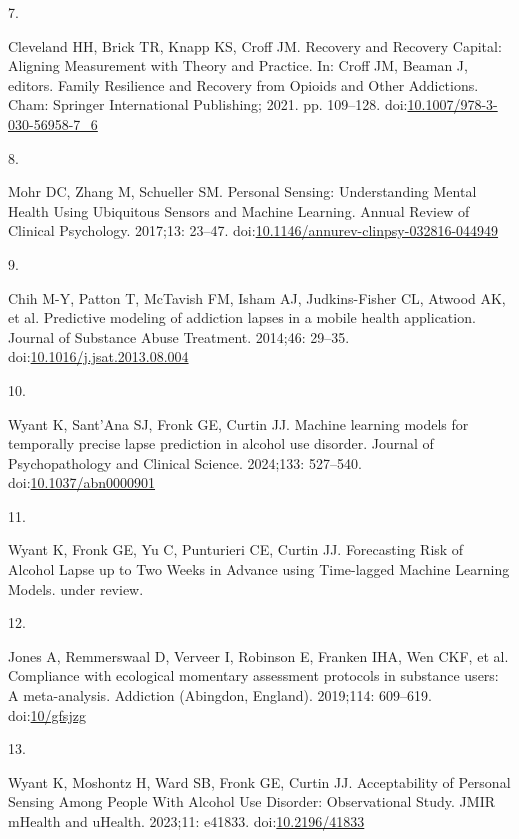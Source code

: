 \documentclass[
  letterpaper,
  DIV=11,
  numbers=noendperiod]{scrartcl}
\newlength{\cslhangindent}
\newlength{\csllabelwidth}
\newenvironment{CSLReferences}[2] %
 {\begin{list}{}{%
  \setlength{\itemindent}{0pt}
  \setlength{\leftmargin}{0pt}
  \setlength{\parsep}{0pt}
  \ifodd #1
   \setlength{\leftmargin}{\cslhangindent}
   \setlength{\itemindent}{-1\cslhangindent}
  \fi
  \setlength{\itemsep}{#2\baselineskip}}}
 {\end{list}}
\newcommand{\CSLLeftMargin}[1]{\parbox[t]{\csllabelwidth}{\strut#1\strut}}
\newcommand{\CSLRightInline}[1]{\parbox[t]{\linewidth - \csllabelwidth}{\strut#1\strut}}
\begin{document}
\begin{CSLReferences}{0}{1}
\CSLLeftMargin{7. }%
\CSLRightInline{Cleveland HH, Brick TR, Knapp KS, Croff JM. Recovery and
{Recovery Capital}: {Aligning Measurement} with {Theory} and {Practice}.
In: Croff JM, Beaman J, editors. Family {Resilience} and {Recovery} from
{Opioids} and {Other Addictions}. Cham: Springer International
Publishing; 2021. pp. 109--128.
doi:\href{https://doi.org/10.1007/978-3-030-56958-7_6}{10.1007/978-3-030-56958-7\_6}}

\CSLLeftMargin{8. }%
\CSLRightInline{Mohr DC, Zhang M, Schueller SM. Personal {Sensing}:
{Understanding Mental Health Using Ubiquitous Sensors} and {Machine
Learning}. Annual Review of Clinical Psychology. 2017;13: 23--47.
doi:\href{https://doi.org/10.1146/annurev-clinpsy-032816-044949}{10.1146/annurev-clinpsy-032816-044949}}

\CSLLeftMargin{9. }%
\CSLRightInline{Chih M-Y, Patton T, McTavish FM, Isham AJ,
Judkins-Fisher CL, Atwood AK, et al. Predictive modeling of addiction
lapses in a mobile health application. Journal of Substance Abuse
Treatment. 2014;46: 29--35.
doi:\href{https://doi.org/10.1016/j.jsat.2013.08.004}{10.1016/j.jsat.2013.08.004}}

\CSLLeftMargin{10. }%
\CSLRightInline{Wyant K, Sant'Ana SJ, Fronk GE, Curtin JJ. Machine
learning models for temporally precise lapse prediction in alcohol use
disorder. Journal of Psychopathology and Clinical Science. 2024;133:
527--540.
doi:\href{https://doi.org/10.1037/abn0000901}{10.1037/abn0000901}}

\CSLLeftMargin{11. }%
\CSLRightInline{Wyant K, Fronk GE, Yu C, Punturieri CE, Curtin JJ.
Forecasting {Risk} of {Alcohol Lapse} up to {Two Weeks} in {Advance}
using {Time-lagged Machine Learning Models}. under review. }

\CSLLeftMargin{12. }%
\CSLRightInline{Jones A, Remmerswaal D, Verveer I, Robinson E, Franken
IHA, Wen CKF, et al. Compliance with ecological momentary assessment
protocols in substance users: A meta-analysis. Addiction (Abingdon,
England). 2019;114: 609--619.
doi:\href{https://doi.org/10/gfsjzg}{10/gfsjzg}}

\CSLLeftMargin{13. }%
\CSLRightInline{Wyant K, Moshontz H, Ward SB, Fronk GE, Curtin JJ.
Acceptability of {Personal Sensing Among People With Alcohol Use
Disorder}: {Observational Study}. JMIR mHealth and uHealth. 2023;11:
e41833. doi:\href{https://doi.org/10.2196/41833}{10.2196/41833}}


\end{CSLReferences}
\end{document}
